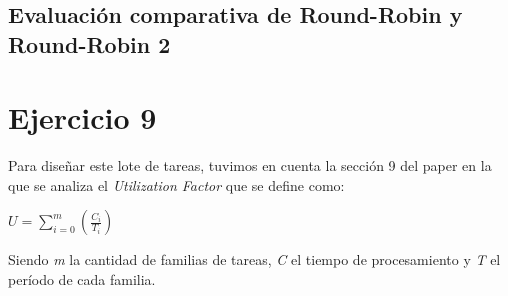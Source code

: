 \documentclass[a4paper,11pt]{article}
\begin{document}
	\subsection{Evaluación comparativa de Round-Robin y Round-Robin 2}

\section{Ejercicio 9}

Para diseñar este lote de tareas, tuvimos en cuenta la sección 9 del paper en la que se analiza el \emph{Utilization Factor} que se define como:

\begin{center}
$\displaystyle U = \sum_{i=0}^{m} \left(\frac{C_i}{T_i}\right) $
\end{center}
Siendo \emph{m} la cantidad de familias de tareas, \emph{C} el tiempo de procesamiento y \emph{T} el período de cada familia.
\end{document}
